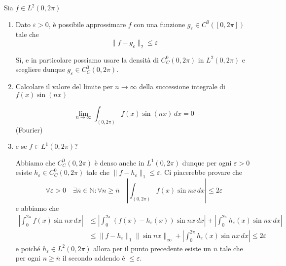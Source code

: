 \begin{eser}[Es. 3 del 4\--12\--2020]
    Sia \(f \in L^2{(0, 2\pi)}\) 
\begin{enumerate}[label = \alph*.]
    \item Dato \(\varepsilon > 0\), è possibile approssimare \(f\) con una
        funzione \(g_{\varepsilon} \in C^{0}{([0, 2\pi])}\) tale che 
        \[
          \|f - g_{\varepsilon}  \|_2 \le \varepsilon
        \]

        Sì, e in particolare possiamo usare la densità di \(C^{0}_C{(0, 2\pi)}\)
        in \(L^2{(0, 2\pi)}\) e scegliere dunque \(g_\varepsilon \in
        C_C^{0}{(0, 2\pi)}\). 
    \item Calcolare il valore del limite per \(n \to \infty\) della successione
        integrale di \(f{(x)} \sin{(nx)}\) 

        \[
          \lim_{n \to \infty} \int _{{(0, 2\pi)}} f{(x)}\sin {(nx)} \,dx = 0
        \] (Fourier)
    \item e se \(f \in L^{1}{(0, 2\pi)}\)? 
        
        Abbiamo che \(C_C^{0}{(0, 2\pi)}\) è denso anche in \(L^{1}{(0, 2\pi)}\)
        dunque per ogni \(\varepsilon > 0\) esiste \(h_\varepsilon \in
        C^{0}_C{(0, 2\pi)}\) tale che \(\|f - h_\varepsilon\|_1 \le
        \varepsilon\). Ci piacerebbe provare che
        \[
          \forall \varepsilon > 0 \quad \exists \overline{n} \in \mathbb{N} :
          \forall n \ge \overline{n} \quad \left| \int _{{(0, 2\pi)}} f{(x)}\sin
          nx\,dx \right| \le 2\varepsilon
        \]
        e abbiamo che
\begin{align*}
    \left| \int_{0}^{2\pi} f{(x)}\sin nx  \,dx  \right| &\le \left|
    \int_{0}^{2\pi} {\left( f{(x)} - h_\varepsilon {(x)} \right)} \sin
    nx \,dx \right| + \left| \int_{0}^{2\pi} h_\varepsilon {(x)} \sin nx \,dx \right| \\
    &\le \|f - h_\varepsilon\|_1 \|\sin nx\|_{\infty} + \left|
    \int_{0}^{2\pi} h_\varepsilon {(x)} \sin nx \,dx  \right| \le 2\varepsilon
\end{align*}
        e poiché \(h_\varepsilon \in L^2{(0, 2\pi)}\) allora per il punto
        precedente esiste un \(\overline{n}\) tale che per ogni \(n \ge
        \overline{n}\) il secondo addendo è \(\le  \varepsilon\). 
\end{enumerate}
\end{eser}

